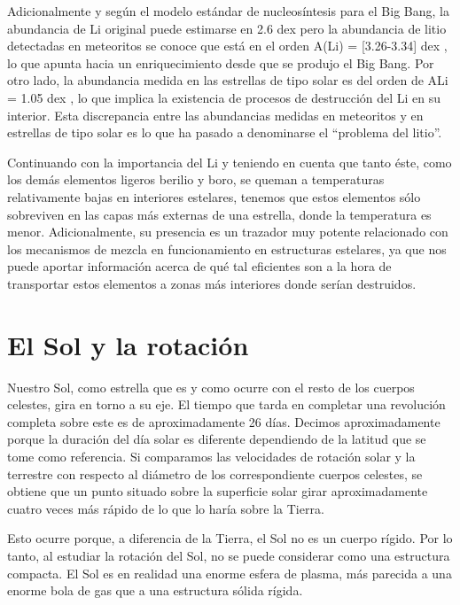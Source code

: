 Adicionalmente y según el modelo estándar de nucleosíntesis para el Big Bang, la abundancia de Li original puede estimarse en 2.6 dex \cite{Spergel2003} pero la abundancia de litio detectadas en meteoritos se conoce que está en el orden A(Li) = [3.26-3.34] dex \cite{Randich2006, Grevesse2007}, lo que apunta hacia un enriquecimiento desde que se produjo el Big Bang. Por otro lado, la abundancia medida en las estrellas de tipo solar es del orden de ALi = 1.05 dex \cite{Grevesse2007}, lo que implica la existencia de procesos de destrucción del Li en su interior.  Esta discrepancia entre las abundancias medidas en meteoritos y en estrellas de tipo solar es lo que ha pasado a denominarse el “problema del litio”.\par

Continuando con la importancia del Li y teniendo en cuenta que tanto éste, como los demás elementos ligeros berilio y boro, se queman a temperaturas relativamente bajas en interiores estelares, tenemos que estos elementos sólo sobreviven en las capas más externas de una estrella, donde la temperatura es menor. Adicionalmente, su presencia es un trazador muy potente relacionado con los mecanismos de mezcla en funcionamiento en estructuras estelares, ya que nos puede aportar información acerca de qué tal eficientes son a la hora de transportar estos elementos a zonas más interiores donde serían destruidos.\par

\section{El Sol y la rotación}
Nuestro Sol, como estrella que es y como ocurre con el resto de los cuerpos celestes, gira en torno a su eje. El tiempo que tarda en completar una revolución completa sobre este es de aproximadamente 26 días. Decimos aproximadamente porque la duración del día solar es diferente dependiendo de la latitud que se tome como referencia. Si comparamos las velocidades de rotación solar y la terrestre con respecto al diámetro de los correspondiente cuerpos celestes, se obtiene que un punto situado sobre la superficie solar girar aproximadamente cuatro veces más rápido de lo que lo haría sobre la Tierra.

Esto ocurre porque, a diferencia de la Tierra, el Sol no es un cuerpo rígido. Por lo tanto, al estudiar la rotación del Sol, no se puede considerar como una estructura compacta. El Sol es en realidad una enorme esfera de plasma, más parecida a una enorme bola de gas que a una estructura sólida rígida.\par

